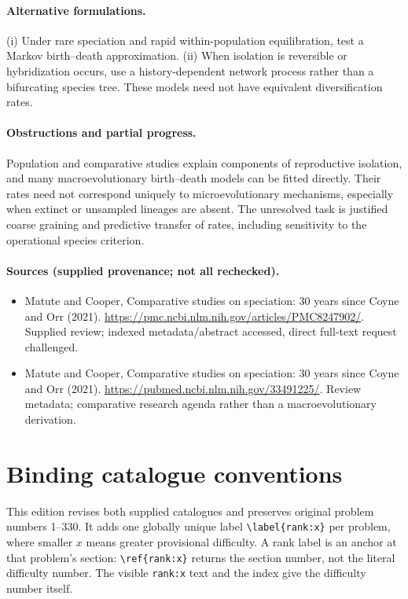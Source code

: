 \documentclass[11pt]{article}
\begin{document}
\paragraph{Alternative formulations.} (i) Under rare speciation and rapid within-population equilibration, test a Markov birth--death approximation. (ii) When isolation is reversible or hybridization occurs, use a history-dependent network process rather than a bifurcating species tree. These models need not have equivalent diversification rates.
\paragraph{Obstructions and partial progress.} Population and comparative studies explain components of reproductive isolation, and many macroevolutionary birth--death models can be fitted directly. Their rates need not correspond uniquely to microevolutionary mechanisms, especially when extinct or unsampled lineages are absent. The unresolved task is justified coarse graining and predictive transfer of rates, including sensitivity to the operational species criterion.
\paragraph{Sources (supplied provenance; not all rechecked).}
\begin{itemize}
\item Matute and Cooper, Comparative studies on speciation: 30 years since Coyne and Orr (2021). \url{https://pmc.ncbi.nlm.nih.gov/articles/PMC8247902/}. Supplied review; indexed metadata/abstract accessed, direct full-text request challenged.
\item Matute and Cooper, Comparative studies on speciation: 30 years since Coyne and Orr (2021). \url{https://pubmed.ncbi.nlm.nih.gov/33491225/}. Review metadata; comparative research agenda rather than a macroevolutionary derivation.
\end{itemize}


\section*{Binding catalogue conventions}
This edition revises both supplied catalogues and preserves original problem numbers 1--330. It adds one globally unique label \verb|\label{rank:x}| per problem, where smaller $x$ means greater provisional difficulty. A rank label is an anchor at that problem's section: \verb|\ref{rank:x}| returns the section number, not the literal difficulty number. The visible \texttt{rank:x} text and the index give the difficulty number itself.
\end{document}
